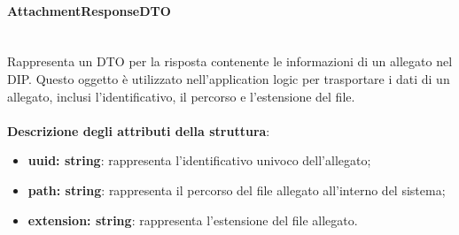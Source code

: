 \documentclass[a4paper,12pt]{article}
\begin{document}
{{{                \paragraph{AttachmentResponseDTO}\label{par:AttachmentResponseDTO}\mbox{}\\
                Rappresenta un DTO per la risposta contenente le informazioni di un allegato nel DIP. Questo oggetto è utilizzato nell'application logic per trasportare i dati di un allegato, inclusi l'identificativo, il percorso e l'estensione del file.\\
                \\
                \textbf{Descrizione degli attributi della struttura}:
                \begin{itemize}
                    \item \textbf{uuid: string}: rappresenta l'identificativo univoco dell'allegato;
                    \item \textbf{path: string}: rappresenta il percorso del file allegato all'interno del sistema;
                    \item \textbf{extension: string}: rappresenta l'estensione del file allegato.
                \end{itemize}
}}}
\end{document}

